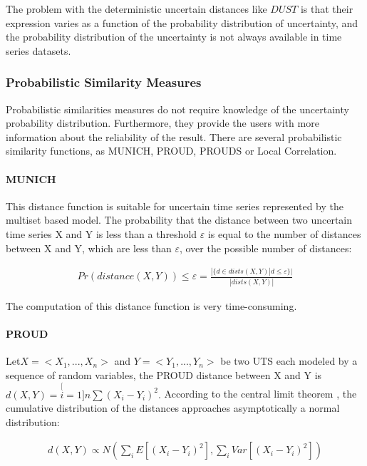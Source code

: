 The problem with the deterministic uncertain distances like $DUST$ is that their expression varies as a function of the probability distribution of uncertainty,  and the probability distribution of the uncertainty is not always available in time series datasets.


\subsubsection{Probabilistic Similarity Measures}
Probabilistic similarities measures do not require knowledge of the uncertainty probability distribution. Furthermore, they provide the users with more information about the reliability of the result. There are several probabilistic similarity functions, as MUNICH, PROUD, PROUDS or Local Correlation. 
\paragraph{MUNICH}
\cite{assfalg2009probabilistic}
This distance function is suitable for uncertain time series represented by the multiset based model. The probability that the distance between two uncertain time series X and Y is less than a threshold $\varepsilon$ is equal to the number of distances between X and Y, which are less than $\varepsilon$, over the possible number of distances:

\begin{eqnarray}
Pr(distance(X,Y))\leq\varepsilon=\frac{|\{d\in
dists(X,Y)|d\leq\varepsilon\}|}{|dists(X,Y)|}
\end{eqnarray}

The computation of this distance function is very time-consuming.

\paragraph{PROUD}
\cite{yeh2009proud} Let$X=<X_{1},...,X_{n}>$ and $Y=<Y_{1},...,Y_{n}>$ be two
UTS each modeled  by a sequence of random variables, the PROUD distance between X and Y is $d(X,Y)=\stackrel[i=1]{n}{\sum}(X_{i}-Y_{i})^{2}.$
According to the central limit theorem \cite{hoffmann1976law}, the cumulative distribution of the distances approaches asymptotically a normal distribution:

\begin{eqnarray}
d(X,Y)\propto
N(\underset{i}{\sum}E[(X_{i}-Y_{i})^{2}],\underset{i}{\sum}Var[(X_{i}-Y_{i})^{2}])
\end{eqnarray}


